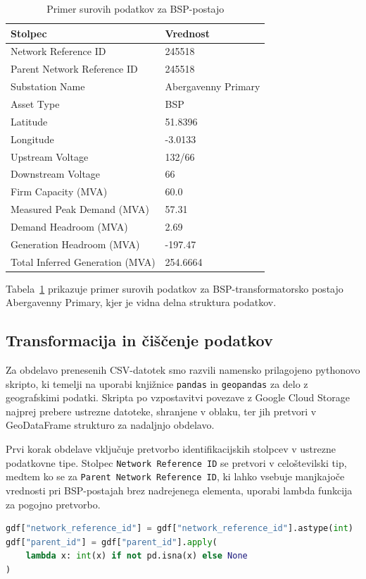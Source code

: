 \documentclass[a4paper,12pt,openright]{book}
\begin{document}
\begin{table}[h]
\centering
\caption{Primer surovih podatkov za BSP-postajo}
\label{tab:data_structure}
\begin{tabular}{ll}
\hline
\textbf{Stolpec} & \textbf{Vrednost} \\
\hline
Network Reference ID & 245518 \\
Parent Network Reference ID & 245518 \\
Substation Name & Abergavenny Primary \\
Asset Type & BSP \\
Latitude & 51.8396 \\
Longitude & -3.0133 \\
Upstream Voltage & 132/66 \\
Downstream Voltage & 66 \\
Firm Capacity (MVA) & 60.0 \\
Measured Peak Demand (MVA) & 57.31 \\
Demand Headroom (MVA) & 2.69 \\
Generation Headroom (MVA) & -197.47 \\
Total Inferred Generation (MVA) & 254.6664 \\
\hline
\end{tabular}
\end{table}
Tabela~\ref{tab:data_structure} prikazuje primer surovih podatkov za BSP-transformatorsko postajo Abergavenny Primary, kjer je vidna delna struktura podatkov.

\subsection{Transformacija in čiščenje podatkov}

Za obdelavo prenesenih CSV-datotek smo razvili namensko prilagojeno pythonovo skripto, ki temelji na uporabi knjižnice \texttt{pandas} in \texttt{geopandas} za delo z geografskimi podatki. Skripta po vzpostavitvi povezave z Google Cloud Storage najprej prebere ustrezne datoteke, shranjene v oblaku, ter jih pretvori v GeoDataFrame strukturo za nadaljnjo obdelavo.

Prvi korak obdelave vključuje pretvorbo identifikacijskih stolpcev v ustrezne podatkovne tipe. Stolpec \texttt{Network Reference ID} se pretvori v celoštevilski tip, medtem ko se za \texttt{Parent Network Reference ID}, ki lahko vsebuje manjkajoče vrednosti pri BSP-postajah brez nadrejenega elementa, uporabi lambda funkcija za pogojno pretvorbo.

\begin{lstlisting}[language=Python, caption={Pretvorba identifikacijskih stolpcev}, captionpos=b, label={lst:id_conversion}]
gdf["network_reference_id"] = gdf["network_reference_id"].astype(int)
gdf["parent_id"] = gdf["parent_id"].apply(
    lambda x: int(x) if not pd.isna(x) else None
)
\end{lstlisting}
\end{document}
